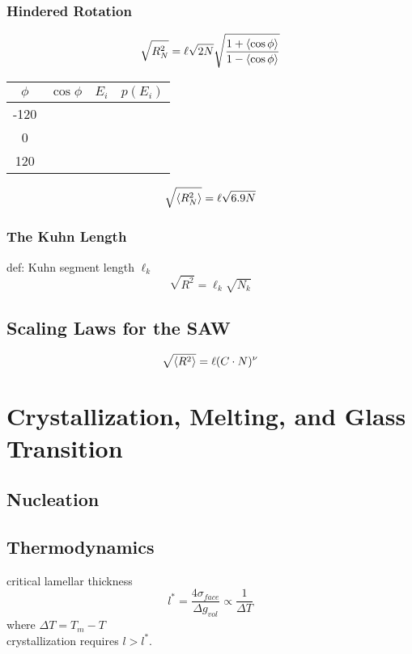 \documentclass[a4paper]{article}
\begin{document}
\subsubsection{Hindered Rotation}
\begin{equation}\label{key}
\sqrt{R_N^2} = \ell\sqrt{2 N}\sqrt{\dfrac{1+\ev{\cos\phi}}{1-\ev{\cos\phi}}}
\end{equation}
\begin{table}[H]
	\centering
	\begin{tabular}{cccc}
		\hline
		$ \phi $ & $ \cos\phi $ & $ E_i $ & $ p(E_i) $\\ \hline
		-120 &&&\\
		0&&&\\
		120&&&\\ \hline
	\end{tabular}
\end{table}
\begin{equation}\label{key}
\sqrt{\ev{R_N^2}} = \ell\sqrt{6.9 N}
\end{equation}
\subsubsection{The Kuhn Length}
def: Kuhn segment length $ \ell_k $
\begin{equation}\label{key}
\sqrt{R^2} = \ell_k\sqrt{N_k}
\end{equation}

\subsection{Scaling Laws for the SAW}
\begin{equation}\label{key}
\sqrt{\ev{R^2}} = \ell(C\cdot N)^\nu
\end{equation}

\section{Crystallization, Melting, and Glass Transition}

\subsection{Nucleation}

\subsection{Thermodynamics}
critical lamellar thickness
\begin{equation}\label{key}
l^* = \dfrac{4\sigma_{face}}{\Delta g_{vol}} \propto \dfrac{1}{\Delta T}
\end{equation}
where $ \Delta T = T_m - T $\\
crystallization requires $ l > l^* $.\\
\end{document}

